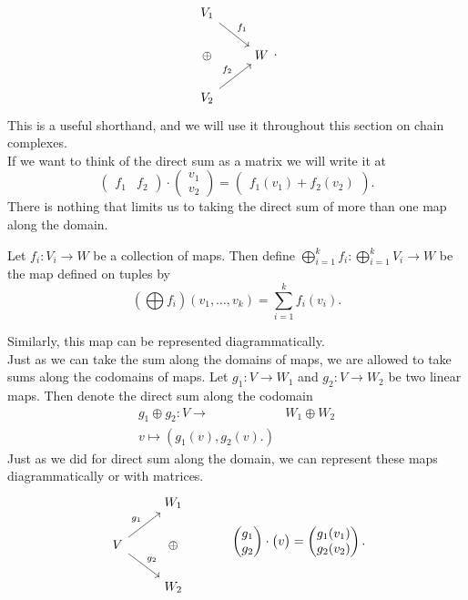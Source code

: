 \[
\begin{tikzcd}
V_1\arrow{dr}{f_1}\\
\oplus & W\\
V_2 \arrow{ur}{f_2}
\end{tikzcd}.
\]
This is a useful shorthand, and we will use it throughout this section on chain complexes. \\
If we want to think of the direct sum as a matrix we will write it at 
\[\begin{pmatrix} f_1 & f_2 \end{pmatrix} \cdot \begin{pmatrix} v_1\\v_2\end{pmatrix} = \begin{pmatrix}f_1(v_1)+f_2(v_2) \end{pmatrix}.\]
There is nothing that limits us to taking the direct sum of more than one map along the domain. 
\begin{definition}
Let $f_i: V_i\to W$ be a collection of maps. Then define $\bigoplus_{i=1}^k f_i: \bigoplus_{i=1}^k V_i\to W$ be the map defined on tuples by
\[\left(\bigoplus f_i\right)(v_1, \ldots, v_{k})=\sum_{i=1}^k f_i(v_i).\]
\end{definition}
Similarly, this map can be represented diagrammatically. \\
Just as we can take the sum along the domains of maps, we are allowed to take sums along the codomains of maps. Let $g_1: V\to W_1$ and $g_2: V\to W_2$ be two linear maps. Then denote the direct sum along the codomain
\begin{align*}
g_1\oplus g_2: V\to & W_1\oplus W_2\\
v\mapsto (g_1(v), g_2(v).)
\end{align*}
Just as we did for direct sum along the domain, we can represent these maps diagrammatically or with matrices. 
\[\begin{tikzcd}
\;& W_1\\
V\arrow{ur}{g_1}   \arrow{dr}{g_2} & \oplus \\
\; & W_2 
\end{tikzcd}\;\;\;\;\;\;\;\;\;\;\;\;\begin{pmatrix} g_1 \\ g_2 \end{pmatrix} \cdot \begin{pmatrix} v\end{pmatrix} = \begin{pmatrix}g_1(v_1)\\g_2(v_2) \end{pmatrix}.\]
